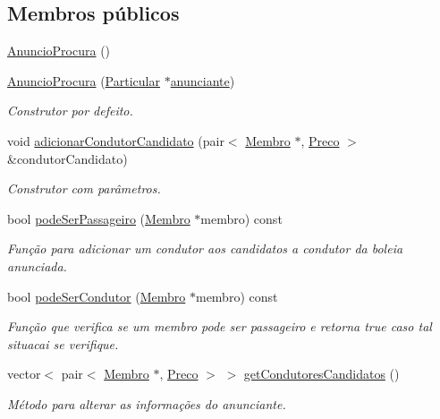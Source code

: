 \subsection*{Membros públicos}
\begin{DoxyCompactItemize}
\item 
\hyperlink{class_anuncio_procura_af0d631aecbb747fb64ad8a80f50944b0}{Anuncio\+Procura} ()
\item 
\hyperlink{class_anuncio_procura_a03743cdc7492d168d554b8dcd56982aa}{Anuncio\+Procura} (\hyperlink{class_particular}{Particular} $\ast$\hyperlink{class_anuncio_a58250bfc8ab82d4308839b1e26213a0f}{anunciante})
\begin{DoxyCompactList}\small\item\em Construtor por defeito. \end{DoxyCompactList}\item 
void \hyperlink{class_anuncio_procura_a1aede1a94eb45ff994d537379091077c}{adicionar\+Condutor\+Candidato} (pair$<$ \hyperlink{class_membro}{Membro} $\ast$, \hyperlink{class_preco}{Preco} $>$ \&condutor\+Candidato)
\begin{DoxyCompactList}\small\item\em Construtor com parâmetros. \end{DoxyCompactList}\item 
bool \hyperlink{class_anuncio_procura_aab615cb1457ec3784d55149d44cdc458}{pode\+Ser\+Passageiro} (\hyperlink{class_membro}{Membro} $\ast$membro) const 
\begin{DoxyCompactList}\small\item\em Função para adicionar um condutor aos candidatos a condutor da boleia anunciada. \end{DoxyCompactList}\item 
bool \hyperlink{class_anuncio_procura_aa7689f1ae7175e99b144c48422231e17}{pode\+Ser\+Condutor} (\hyperlink{class_membro}{Membro} $\ast$membro) const 
\begin{DoxyCompactList}\small\item\em Função que verifica se um membro pode ser passageiro e retorna true caso tal situacai se verifique. \end{DoxyCompactList}\item 
vector$<$ pair$<$ \hyperlink{class_membro}{Membro} $\ast$, \hyperlink{class_preco}{Preco} $>$ $>$ \hyperlink{class_anuncio_procura_a8149478f041f545ce8ccb8958d39cfbd}{get\+Condutores\+Candidatos} ()
\begin{DoxyCompactList}\small\item\em Método para alterar as informações do anunciante. \end{DoxyCompactList}\item 

\end{DoxyCompactItemize}
